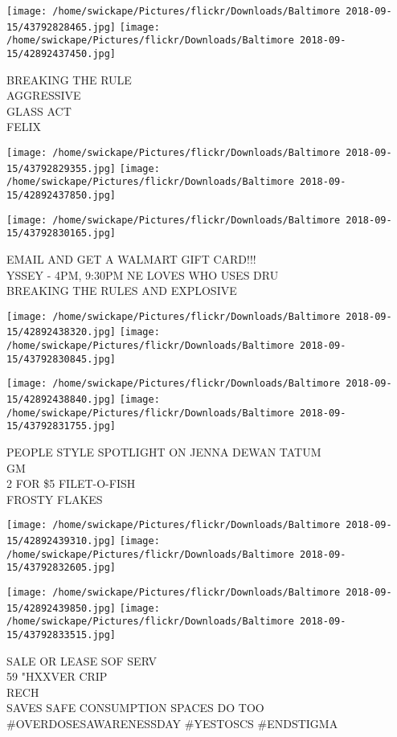 \documentclass[10pt,letterpaper]{article}
\begin{document}
\texttt{[image: /home/swickape/Pictures/flickr/Downloads/Baltimore 2018-09-15/43792828465.jpg]}
\texttt{[image: /home/swickape/Pictures/flickr/Downloads/Baltimore 2018-09-15/42892437450.jpg]}

BREAKING THE RULE\\
AGGRESSIVE\\
GLASS ACT\\
FELIX
\pagebreak

\texttt{[image: /home/swickape/Pictures/flickr/Downloads/Baltimore 2018-09-15/43792829355.jpg]}
\texttt{[image: /home/swickape/Pictures/flickr/Downloads/Baltimore 2018-09-15/42892437850.jpg]}

\vspace{0.25in}
\texttt{[image: /home/swickape/Pictures/flickr/Downloads/Baltimore 2018-09-15/43792830165.jpg]}

EMAIL AND GET A WALMART GIFT CARD!!!\\
YSSEY {-} 4PM, 9:30PM NE LOVES WHO USES DRU\\
BREAKING THE RULES AND EXPLOSIVE
\pagebreak

\texttt{[image: /home/swickape/Pictures/flickr/Downloads/Baltimore 2018-09-15/42892438320.jpg]}
\texttt{[image: /home/swickape/Pictures/flickr/Downloads/Baltimore 2018-09-15/43792830845.jpg]}

\texttt{[image: /home/swickape/Pictures/flickr/Downloads/Baltimore 2018-09-15/42892438840.jpg]}
\texttt{[image: /home/swickape/Pictures/flickr/Downloads/Baltimore 2018-09-15/43792831755.jpg]}

PEOPLE STYLE SPOTLIGHT ON JENNA DEWAN TATUM\\
GM\\
2 FOR \$5 FILET{-}O{-}FISH\\
FROSTY FLAKES
\pagebreak

\texttt{[image: /home/swickape/Pictures/flickr/Downloads/Baltimore 2018-09-15/42892439310.jpg]}
\texttt{[image: /home/swickape/Pictures/flickr/Downloads/Baltimore 2018-09-15/43792832605.jpg]}

\texttt{[image: /home/swickape/Pictures/flickr/Downloads/Baltimore 2018-09-15/42892439850.jpg]}
\texttt{[image: /home/swickape/Pictures/flickr/Downloads/Baltimore 2018-09-15/43792833515.jpg]}

SALE OR LEASE SOF SERV\\
59 "HXXVER CRIP\\
RECH\\
SAVES SAFE CONSUMPTION SPACES DO TOO \#OVERDOSESAWARENESSDAY \#YESTOSCS \#ENDSTIGMA
\pagebreak
\end{document}
